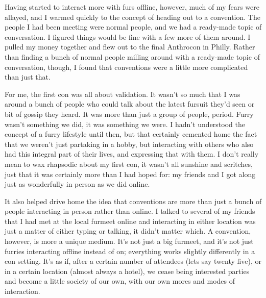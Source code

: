 Having started to interact more with furs offline, however, much of my fears were allayed, and I warmed quickly to the concept of heading out to a convention.  The people I had been meeting were normal people, and we had a ready-made topic of conversation.  I figured things would be fine with a few more of them around.  I pulled my money together and flew out to the final Anthrocon in Philly.  Rather than finding a bunch of normal people milling around with a ready-made topic of conversation, though, I found that conventions were a little more complicated than just that.

For me, the first con was all about validation.  It wasn't so much that I was around a bunch of people who could talk about the latest fursuit they'd seen or bit of gossip they heard.  It was more than just a group of people, period.  Furry wasn't something we did, it was something we were.  I hadn't understood the concept of a furry lifestyle until then, but that certainly cemented home the fact that we weren't just partaking in a hobby, but interacting with others who also had this integral part of their lives, and expressing that with them.  I don't really mean to wax rhapsodic about my first con, it wasn't all sunshine and scritches, just that it was certainly more than I had hoped for: my friends and I got along just as wonderfully in person as we did online.

It also helped drive home the idea that conventions are more than just a bunch of people interacting in person rather than online.  I talked to several of my friends that I had met at the local furmeet online and interacting in either location was just a matter of either typing or talking, it didn't matter which.  A convention, however, is more a unique medium.  It's not just a big furmeet, and it's not just furries interacting offline instead of on; everything works slightly differently in a con setting.  It's as if, after a certain number of attendees (lets say twenty five), or in a certain location (almost always a hotel), we cease being interested parties and become a little society of our own, with our own mores and modes of interaction.

